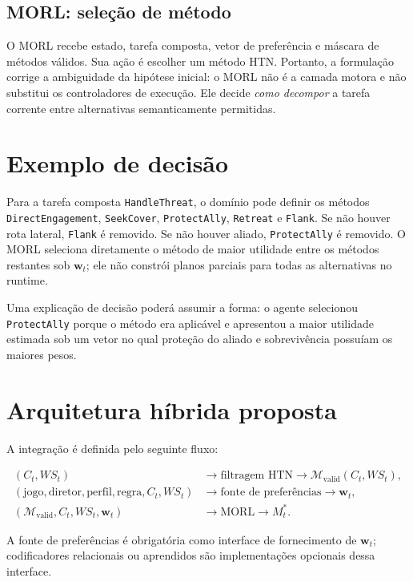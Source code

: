 \subsection{MORL: seleção de método}

O MORL recebe estado, tarefa composta, vetor de preferência e máscara de
métodos válidos.
Sua ação é escolher um método HTN.
Portanto, a formulação corrige a ambiguidade da hipótese inicial: o MORL não é a
camada motora e não substitui os controladores de execução.
Ele decide \emph{como decompor} a tarefa corrente entre alternativas semanticamente
permitidas.

\section{Exemplo de decisão}

Para a tarefa composta \texttt{HandleThreat}, o domínio pode definir os métodos
\texttt{Direct\-Engagement}, \texttt{Seek\-Cover},
\texttt{Protect\-Ally}, \texttt{Retreat} e \texttt{Flank}.
Se não houver rota lateral, \texttt{Flank} é removido.
Se não houver aliado, \texttt{Protect\-Ally} é removido.
O MORL seleciona diretamente o método de maior utilidade entre os métodos
restantes sob $\mathbf{w}_t$; ele não constrói planos parciais para todas as
alternativas no runtime.

Uma explicação de decisão poderá assumir a forma: o agente selecionou
\texttt{Protect\-Ally} porque o método era aplicável e apresentou a maior
utilidade estimada sob um vetor no qual proteção do aliado e sobrevivência
possuíam os maiores pesos.

\section{Arquitetura híbrida proposta}

A integração é definida pelo seguinte fluxo:

\begin{align}
(C_t,WS_t)
&\longrightarrow \text{filtragem HTN}
\longrightarrow \mathcal{M}_{\mathrm{valid}}(C_t,WS_t),\\
(\text{jogo},\text{diretor},\text{perfil},\text{regra},C_t,WS_t)
&\longrightarrow \text{fonte de preferências}
\longrightarrow \mathbf{w}_t,\\
(\mathcal{M}_{\mathrm{valid}},C_t,WS_t,\mathbf{w}_t)
&\longrightarrow \text{MORL}
\longrightarrow M_t^*.
\end{align}

A fonte de preferências é obrigatória como interface de fornecimento de
$\mathbf{w}_t$; codificadores relacionais ou aprendidos são implementações
opcionais dessa interface.

